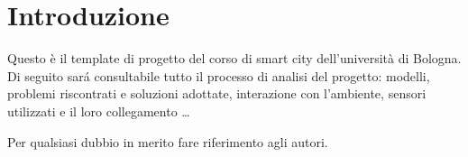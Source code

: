 \section{Introduzione}

Questo è il template di progetto del corso di smart city dell'università di Bologna. Di seguito sar\'a consultabile tutto il processo di analisi del progetto: modelli, problemi riscontrati e soluzioni adottate, interazione con l'ambiente, sensori utilizzati e il loro collegamento \ldots

Per qualsiasi dubbio in merito fare riferimento agli autori.
